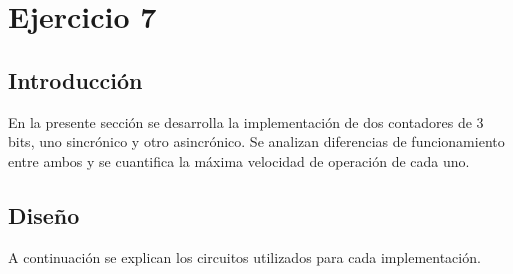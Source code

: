 \section{Ejercicio 7}

\subsection{Introducci\'on}
\noindent
En la presente sección se desarrolla la implementaci\'on de dos contadores de 3 bits, uno sincr\'onico y otro asincr\'onico. Se analizan diferencias de funcionamiento entre ambos y se cuantifica la m\'axima velocidad de operaci\'on de cada uno. 

\subsection{Diseño}
\noindent
A continuaci\'on se explican los circuitos utilizados para cada implementaci\'on.

